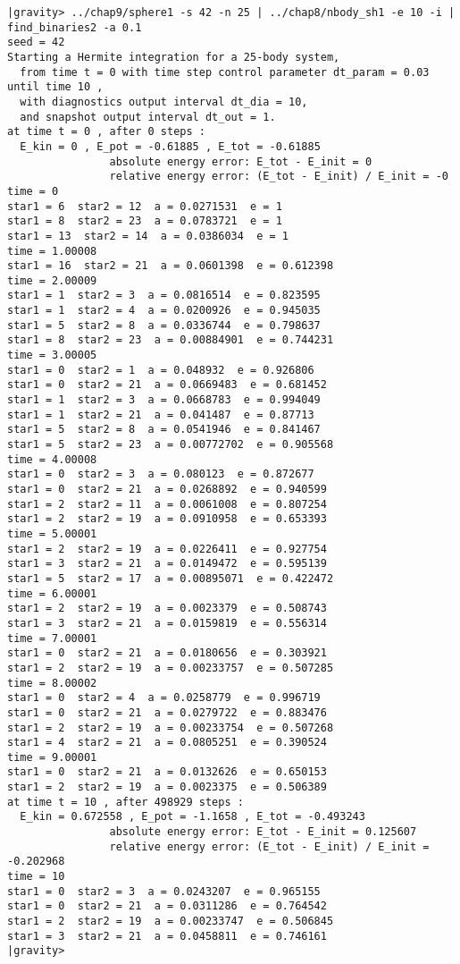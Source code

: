 \begin{small}
\begin{verbatim}
|gravity> ../chap9/sphere1 -s 42 -n 25 | ../chap8/nbody_sh1 -e 10 -i | find_binaries2 -a 0.1
seed = 42
Starting a Hermite integration for a 25-body system,
  from time t = 0 with time step control parameter dt_param = 0.03  until time 10 ,
  with diagnostics output interval dt_dia = 10,
  and snapshot output interval dt_out = 1.
at time t = 0 , after 0 steps :
  E_kin = 0 , E_pot = -0.61885 , E_tot = -0.61885
                absolute energy error: E_tot - E_init = 0
                relative energy error: (E_tot - E_init) / E_init = -0
time = 0
star1 = 6  star2 = 12  a = 0.0271531  e = 1
star1 = 8  star2 = 23  a = 0.0783721  e = 1
star1 = 13  star2 = 14  a = 0.0386034  e = 1
time = 1.00008
star1 = 16  star2 = 21  a = 0.0601398  e = 0.612398
time = 2.00009
star1 = 1  star2 = 3  a = 0.0816514  e = 0.823595
star1 = 1  star2 = 4  a = 0.0200926  e = 0.945035
star1 = 5  star2 = 8  a = 0.0336744  e = 0.798637
star1 = 8  star2 = 23  a = 0.00884901  e = 0.744231
time = 3.00005
star1 = 0  star2 = 1  a = 0.048932  e = 0.926806
star1 = 0  star2 = 21  a = 0.0669483  e = 0.681452
star1 = 1  star2 = 3  a = 0.0668783  e = 0.994049
star1 = 1  star2 = 21  a = 0.041487  e = 0.87713
star1 = 5  star2 = 8  a = 0.0541946  e = 0.841467
star1 = 5  star2 = 23  a = 0.00772702  e = 0.905568
time = 4.00008
star1 = 0  star2 = 3  a = 0.080123  e = 0.872677
star1 = 0  star2 = 21  a = 0.0268892  e = 0.940599
star1 = 2  star2 = 11  a = 0.0061008  e = 0.807254
star1 = 2  star2 = 19  a = 0.0910958  e = 0.653393
time = 5.00001
star1 = 2  star2 = 19  a = 0.0226411  e = 0.927754
star1 = 3  star2 = 21  a = 0.0149472  e = 0.595139
star1 = 5  star2 = 17  a = 0.00895071  e = 0.422472
time = 6.00001
star1 = 2  star2 = 19  a = 0.0023379  e = 0.508743
star1 = 3  star2 = 21  a = 0.0159819  e = 0.556314
time = 7.00001
star1 = 0  star2 = 21  a = 0.0180656  e = 0.303921
star1 = 2  star2 = 19  a = 0.00233757  e = 0.507285
time = 8.00002
star1 = 0  star2 = 4  a = 0.0258779  e = 0.996719
star1 = 0  star2 = 21  a = 0.0279722  e = 0.883476
star1 = 2  star2 = 19  a = 0.00233754  e = 0.507268
star1 = 4  star2 = 21  a = 0.0805251  e = 0.390524
time = 9.00001
star1 = 0  star2 = 21  a = 0.0132626  e = 0.650153
star1 = 2  star2 = 19  a = 0.0023375  e = 0.506389
at time t = 10 , after 498929 steps :
  E_kin = 0.672558 , E_pot = -1.1658 , E_tot = -0.493243
                absolute energy error: E_tot - E_init = 0.125607
                relative energy error: (E_tot - E_init) / E_init = -0.202968
time = 10
star1 = 0  star2 = 3  a = 0.0243207  e = 0.965155
star1 = 0  star2 = 21  a = 0.0311286  e = 0.764542
star1 = 2  star2 = 19  a = 0.00233747  e = 0.506845
star1 = 3  star2 = 21  a = 0.0458811  e = 0.746161
|gravity> 
\end{verbatim}
\end{small}


